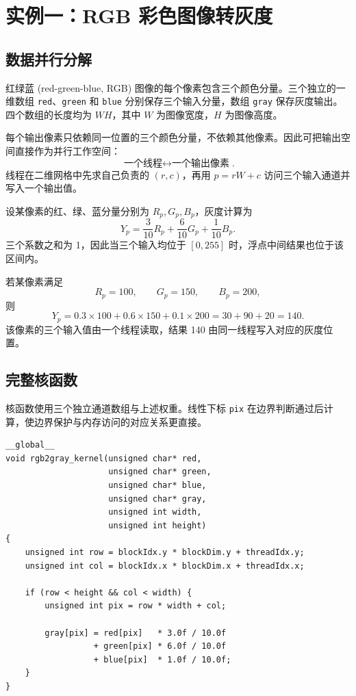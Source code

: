 \section{实例一：RGB 彩色图像转灰度}

\subsection{数据并行分解}

红绿蓝 (red-green-blue, RGB) 图像的每个像素包含三个颜色分量。三个独立的一维数组 \texttt{red}、\texttt{green} 和 \texttt{blue} 分别保存三个输入分量，数组 \texttt{gray} 保存灰度输出。四个数组的长度均为 $WH$，其中 $W$ 为图像宽度，$H$ 为图像高度。

每个输出像素只依赖同一位置的三个颜色分量，不依赖其他像素。因此可把输出空间直接作为并行工作空间：
\[
\boxed{\text{一个线程} \longleftrightarrow \text{一个输出像素}}.
\]
线程在二维网格中先求自己负责的 $(r,c)$，再用 $p=rW+c$ 访问三个输入通道并写入一个输出值。

设某像素的红、绿、蓝分量分别为 $R_p,G_p,B_p$，灰度计算为
\[
\boxed{
Y_p=\frac{3}{10}R_p+\frac{6}{10}G_p+\frac{1}{10}B_p
}.
\]
三个系数之和为 1，因此当三个输入均位于 $[0,255]$ 时，浮点中间结果也位于该区间内。

\begin{examplebox}[title=单个像素的灰度计算]
若某像素满足
\[
R_p=100,\qquad G_p=150,\qquad B_p=200,
\]
则
\[
Y_p=0.3\times100+0.6\times150+0.1\times200
=30+90+20=140.
\]
该像素的三个输入值由一个线程读取，结果 140 由同一线程写入对应的灰度位置。
\end{examplebox}

\subsection{完整核函数}

核函数使用三个独立通道数组与上述权重。线性下标 \texttt{pix} 在边界判断通过后计算，使边界保护与内存访问的对应关系更直接。

\par\noindent\begin{minipage}{\linewidth}
\begin{lstlisting}[caption={带二维边界保护的 RGB 转灰度核函数}]
__global__
void rgb2gray_kernel(unsigned char* red,
                     unsigned char* green,
                     unsigned char* blue,
                     unsigned char* gray,
                     unsigned int width,
                     unsigned int height)
{
    unsigned int row = blockIdx.y * blockDim.y + threadIdx.y;
    unsigned int col = blockIdx.x * blockDim.x + threadIdx.x;

    if (row < height && col < width) {
        unsigned int pix = row * width + col;

        gray[pix] = red[pix]   * 3.0f / 10.0f
                  + green[pix] * 6.0f / 10.0f
                  + blue[pix]  * 1.0f / 10.0f;
    }
}
\end{lstlisting}
\end{minipage}\par

